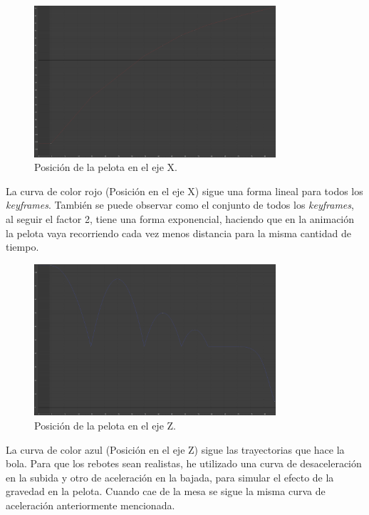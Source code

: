 \documentclass{article}
\begin{document}
\begin{figure}[H]
    \centering
    \includegraphics[width=0.8\textwidth]{imagenes/Ejercicio3/curvas/red.png}
    \caption{Posición de la pelota en el eje X.}
\end{figure}

\bigskip

La curva de color rojo (Posición en el eje X) sigue una forma lineal para todos los \textit{keyframes}. También se puede observar como el conjunto de todos los \textit{keyframes}, al seguir el factor 2, tiene una forma exponencial, haciendo que en la animación la pelota vaya recorriendo cada vez menos distancia para la misma cantidad de tiempo.

\begin{figure}[H]
    \centering
    \includegraphics[width=0.8\textwidth]{imagenes/Ejercicio3/curvas/blue.png}
    \caption{Posición de la pelota en el eje Z.}
\end{figure}

\bigskip

La curva de color azul (Posición en el eje Z) sigue las trayectorias que hace la bola. Para que los rebotes sean realistas, he utilizado una curva de desaceleración en la subida y otro de aceleración en la bajada, para simular el efecto de la gravedad en la pelota. Cuando cae de la mesa se sigue la misma curva de aceleración anteriormente mencionada.
\end{document}
